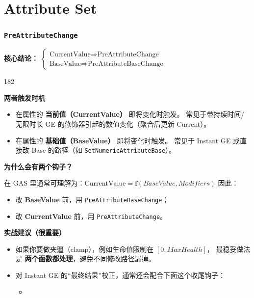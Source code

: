 \documentclass[10pt,CJKmath]{ctexart}
\newenvironment{myenum}{
\begin{dingautolist}{182}\setlength{\itemsep}{0pt}\setlength{\parskip}{0pt}%
}
{\end{dingautolist}}
\begin{document}
\pagestyle{fancynotes}


\part{Attribute Set}

\section{\texttt{PreAttributeChange}}

\textbf{核心结论：}
$\begin{cases}
	\text{CurrentValue}\Rightarrow\text{PreAttributeChange} \\
	\text{BaseValue}\Rightarrow\text{PreAttributeBaseChange}
\end{cases}$

\begin{myenum}
	\item \textbf{两者触发时机}

		\begin{itemize}
			\item {}在属性的 \textbf{当前值（CurrentValue）} 即将变化时触发。  
			常见于带持续时间/无限时长 GE 的修饰器引起的数值变化（聚合后更新 Current）。
			
			\item {}
			在属性的 \textbf{基础值（BaseValue）} 即将变化时触发。  
			常见于 Instant GE 或直接改 Base 的路径（如 \texttt{SetNumericAttributeBase}）。
		\end{itemize}

\item \textbf{为什么会有两个钩子？}

在 GAS 里通常可理解为：\colorbox{yellow!5}{$
\text{CurrentValue} = \mathbf{f}(BaseValue, Modifiers)
$}
因此：
\begin{itemize}
	\item 改 \textbf{BaseValue} 前，用 \texttt{PreAttributeBaseChange}；
	\item 改 \textbf{CurrentValue} 前，用 \texttt{PreAttributeChange}。
\end{itemize}

\item \textbf{实战建议（很重要）}

\begin{itemize}
	\item 如果你要做夹逼（clamp），例如生命值限制在 \([0, MaxHealth]\)，
	最稳妥做法是 \textbf{两个函数都处理}，避免不同修改路径漏掉。
	\item 对 Instant GE 的“最终结果”校正，通常还会配合下面这个收尾钩子：
	\begin{itemize}
		\item {}
	\end{itemize}
\end{itemize}
\end{myenum}
\end{document}
